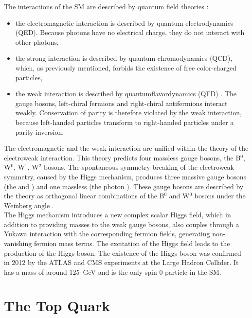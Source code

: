 The interactions of the SM are described by quantum field theories \cite{welsch}:
\begin{itemize}
\item the electromagnetic interaction is described by quantum electrodynamics (QED). Because photons have no electrical charge, they do not interact with other photons,
\item the strong interaction is described by quantum chromodynamics (QCD), which, as previously mentioned, forbids the existence of free color-charged particles,
\item the weak interaction is described by quantumflavordynamics (QFD) \cite{griffiths}. The gauge bosons, left-chiral fermions and right-chiral antifermions interact weakly. Conservation of parity is therefore violated by the weak interaction, because left-handed particles transform to right-handed particles under a parity inversion.
\end{itemize}

The electromagnetic and the weak interaction are unified within the theory of the electroweak interaction. This theory predicts four massless gauge bosons, the B$^{0}$, W$^{0}$, W$^{1}$, W$^{2}$ bosons. The spontaneous symmetry breaking of the electroweak symmetry, caused by the Higgs mechanism, produces three massive gauge bosons (the \PZz and \PWpm) and one massless (the photon \Pphoton). These gauge bosons are described by the theory as orthogonal linear combinations of the B$^{0}$ and W$^{0}$ bosons under the Weinberg angle \cite{wiki:electroweak}.\\

The Higgs mechanism introduces a new complex scalar Higgs field, which in addition to providing masses to the weak gauge bosons, also couples through a Yukawa interaction with the corresponding fermion fields, generating non-vanishing fermion mass terms. The excitation of the Higgs field leads to the production of the Higgs boson. The existence of the Higgs boson was confirmed in 2012 by the ATLAS and CMS experiments at the Large Hadron Collider. It has a mass of around \SI{125}{\giga\eV} \cite{chatrchyan} and is the only spin-0 particle in the SM.

\section{The Top Quark}
\label{sec:theory_top}

